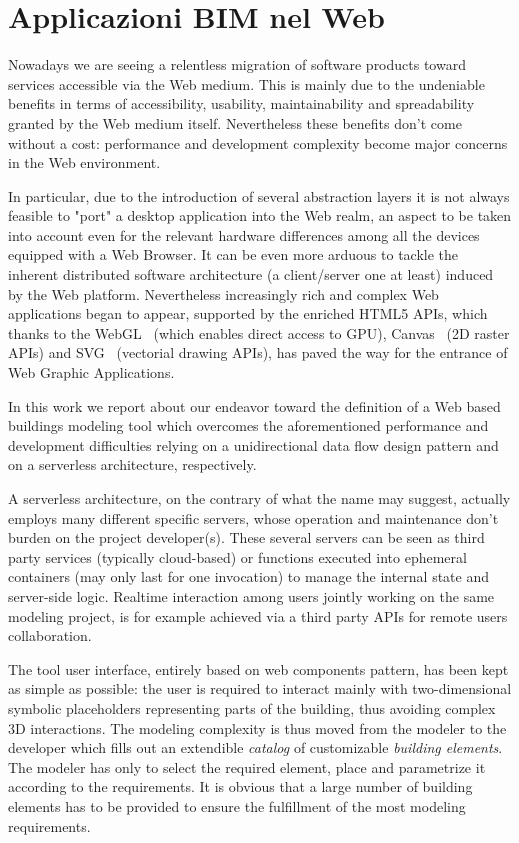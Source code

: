 \section{Applicazioni BIM nel Web}
\label{sec:chapter_1_section_3}

Nowadays we are seeing a relentless migration of software products toward services accessible via the Web medium. This is mainly due to the undeniable benefits in terms of accessibility, usability, maintainability and spreadability granted by the Web medium itself. Nevertheless these benefits don't come without a cost: performance  and development complexity become major concerns in the Web environment.

In particular, due to the introduction of several abstraction layers it is not always feasible to "port" a desktop application into the Web realm, an aspect to be taken into account even for the relevant hardware differences among all the devices equipped with a Web Browser. It can be even more arduous to tackle the inherent distributed software architecture (a client/server one at least) induced by the Web platform. Nevertheless increasingly rich and complex Web applications began to appear, supported by the enriched HTML5 APIs, which thanks to the WebGL~\cite{webgl} (which enables direct access to GPU), Canvas~\cite{Munro:15:HCC} (2D raster APIs) and SVG~\cite{Jackson:11:SVG} (vectorial drawing APIs), has paved the way for the entrance of Web Graphic Applications.

In this work we report about our endeavor toward the definition of a Web based buildings modeling tool which overcomes the aforementioned performance and development difficulties relying on a unidirectional data flow design pattern and on a serverless architecture, respectively.

A serverless architecture, on the contrary of what the name may suggest, actually employs many different specific servers, whose operation and maintenance don't burden on the project developer(s). These several servers can be seen as third party services (typically cloud-based) or functions executed into ephemeral containers (may only last for one invocation) to manage the internal state and server-side logic. Realtime interaction among users jointly working on the same modeling project, is for example achieved via a third party APIs for remote users collaboration.

The tool user interface, entirely based on web components pattern,  has been kept as simple as possible: the user is required to interact mainly with two-dimensional symbolic placeholders representing parts of the building, thus avoiding complex 3D interactions.
The modeling complexity is thus moved from the modeler to the developer which fills out an extendible \emph{catalog} of customizable \emph{building elements}. The modeler has only to select the required element, place and parametrize it according to the requirements. It is obvious that a large number of building elements has to be provided to ensure the fulfillment of the most modeling requirements.

